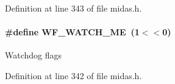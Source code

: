 Definition at line 343 of file midas.h.
\paragraph[{WF\_\-WATCH\_\-ME}]{\setlength{\rightskip}{0pt plus 5cm}\#define WF\_\-WATCH\_\-ME~(1$<$$<$0)}\hfill\label{group__mdefineh_gadbd605a3d827a2ee4a032d73d4b65919}
Watchdog flags 

Definition at line 342 of file midas.h.